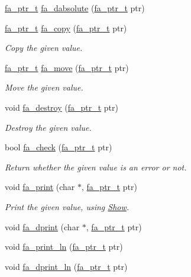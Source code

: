 \begin{DoxyCompactItemize}
\item 
\hyperlink{group___fa_ga915ddeae99ad7568b273d2b876425197}{fa\-\_\-ptr\-\_\-t} \hyperlink{group___fa_gacd2a5cccde5f71bf56779d86e67a8e49}{fa\-\_\-dabsolute} (\hyperlink{group___fa_ga915ddeae99ad7568b273d2b876425197}{fa\-\_\-ptr\-\_\-t} ptr)
\item 
\hyperlink{group___fa_ga915ddeae99ad7568b273d2b876425197}{fa\-\_\-ptr\-\_\-t} \hyperlink{group___fa_ga309916fa19d0be0ae404f6cc634f5568}{fa\-\_\-copy} (\hyperlink{group___fa_ga915ddeae99ad7568b273d2b876425197}{fa\-\_\-ptr\-\_\-t} ptr)
\begin{DoxyCompactList}\small\item\em Copy the given value. \end{DoxyCompactList}\item 
\hyperlink{group___fa_ga915ddeae99ad7568b273d2b876425197}{fa\-\_\-ptr\-\_\-t} \hyperlink{group___fa_ga0d370d9cf88ed4111ba32164a2a7a1ec}{fa\-\_\-move} (\hyperlink{group___fa_ga915ddeae99ad7568b273d2b876425197}{fa\-\_\-ptr\-\_\-t} ptr)
\begin{DoxyCompactList}\small\item\em Move the given value. \end{DoxyCompactList}\item 
void \hyperlink{group___fa_ga6fd6818b190b9e41a3b5f07e78638539}{fa\-\_\-destroy} (\hyperlink{group___fa_ga915ddeae99ad7568b273d2b876425197}{fa\-\_\-ptr\-\_\-t} ptr)
\begin{DoxyCompactList}\small\item\em Destroy the given value. \end{DoxyCompactList}\item 
bool \hyperlink{group___fa_gaec61e23c174faf5e5244ae876d264eb5}{fa\-\_\-check} (\hyperlink{group___fa_ga915ddeae99ad7568b273d2b876425197}{fa\-\_\-ptr\-\_\-t} ptr)
\begin{DoxyCompactList}\small\item\em Return whether the given value is an error or not. \end{DoxyCompactList}\item 
void \hyperlink{group___fa_ga60d1e34d8101c4f20d7e5473c90766a2}{fa\-\_\-print} (char $\ast$, \hyperlink{group___fa_ga915ddeae99ad7568b273d2b876425197}{fa\-\_\-ptr\-\_\-t} ptr)
\begin{DoxyCompactList}\small\item\em Print the given value, using \hyperlink{structfa__string__show__t}{Show}. \end{DoxyCompactList}\item 
void \hyperlink{group___fa_gabe732002639a5e9d712240025443ff4f}{fa\-\_\-dprint} (char $\ast$, \hyperlink{group___fa_ga915ddeae99ad7568b273d2b876425197}{fa\-\_\-ptr\-\_\-t} ptr)
\item 
void \hyperlink{group___fa_gaf738240829f5d2d2352822c6974b7fc0}{fa\-\_\-print\-\_\-ln} (\hyperlink{group___fa_ga915ddeae99ad7568b273d2b876425197}{fa\-\_\-ptr\-\_\-t} ptr)
\item 
void \hyperlink{group___fa_gafe811e843fadc2f035b80cca6e7c5b6c}{fa\-\_\-dprint\-\_\-ln} (\hyperlink{group___fa_ga915ddeae99ad7568b273d2b876425197}{fa\-\_\-ptr\-\_\-t} ptr)
\end{DoxyCompactItemize}


